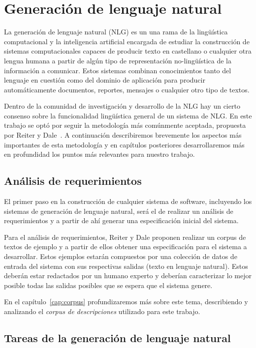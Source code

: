 \chapter{Generación de lenguaje natural}
\label{cap:nlg_intro}
La generación de lenguaje natural (NLG) es un una rama de la lingüística computacional y la inteligencia artificial encargada de estudiar la construcción de sistemas computacionales capaces de producir texto en castellano o cualquier otra lengua humana a partir de algún tipo de representación no-lingüística de la información a comunicar. Estos sistemas combinan conocimientos tanto del lenguaje en cuestión como del dominio de aplicación para producir automáticamente documentos, reportes, mensajes o cualquier otro tipo de textos.

Dentro de la comunidad de investigación y desarrollo de la NLG hay un cierto consenso sobre la funcionalidad lingüística general de un sistema de NLG.
En este trabajo se optó por seguir la metodología más comúnmente aceptada, propuesta por Reiter y Dale~\cite{reiter_dale}.
A continuación describiremos brevemente los aspectos más importantes de esta metodología y en capítulos posteriores desarrollaremos más en profundidad los puntos más relevantes para nuestro trabajo.

\section{Análisis de requerimientos}
El primer paso en la construcción de cualquier sistema de software, incluyendo los sistemas de generación de lenguaje natural, será el de realizar un análisis de requerimientos y a partir de ahí generar una especificación inicial del sistema. 

Para el análisis de requerimientos, Reiter y Dale proponen realizar un corpus de textos de ejemplo y a partir de ellos obtener una especificación para el sistema a desarrollar. Estos ejemplos estarán compuestos por una colección de datos de entrada del sistema con sus respectivas salidas (texto en lenguaje natural). Estos deberán estar redactados por un humano experto y deberían caracterizar lo mejor posible todas las salidas posibles que se espera que el sistema genere.

En el capítulo~\ref{cap:corpus} profundizaremos más sobre este tema, describiendo y analizando el \emph{corpus de descripciones} utilizado para este trabajo.

\section{Tareas de la generación de lenguaje natural}


